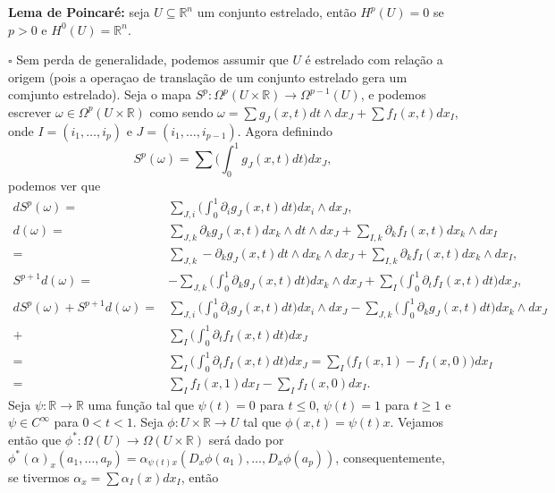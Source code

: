\documentclass{article}
\begin{document}
	\textbf{Lema de Poincaré:} seja $U \subseteq \mathbb{R}^{n}$ um conjunto estrelado, então $H^{p}(U) = 0$ se $p>0$ e $H^{0}(U) = \mathbb{R}^{n}$.
	
	$\square$ Sem perda de generalidade, podemos assumir que $U$ é estrelado com relação a origem (pois a operaçao de translação de um conjunto estrelado gera um comjunto estrelado). Seja o mapa $S^{p}: \Omega^{p}(U \times \mathbb{R}) \to \Omega^{p-1}(U)$, e podemos escrever $\omega \in \Omega^{p}(U \times \mathbb{R}) $ como sendo $\omega = \sum g_{J}(x,t)dt \wedge dx_{J} + \sum f_{I}(x,t)dx_{I}$, onde $I=(i_{1}, \dots ,i_{p})$ e $J=(i_{1}, \dots ,i_{p-1})$. Agora definindo
	$$
	S^{p}(\omega) = \sum \Big( \int_{0}^{1} g_{J}(x,t)dt \Big) dx_{J},
	$$
	podemos ver que
	$$
	\begin{aligned}
	dS^{p}(\omega) =& \sum_{J,i} \Big( \int_{0}^{1} \partial_{i} g_{J}(x,t)dt \Big) dx_{i} \wedge dx_{J},
	\\
	d(\omega) =& \sum_{J,k} \partial_{k} g_{J}(x,t) dx_{k} \wedge dt \wedge dx_{J} + \sum_{I,k} \partial_{k} f_{I}(x,t) dx_{k} \wedge dx_{I}
	\\
	 =& \sum_{J,k} -\partial_{k} g_{J}(x,t) dt \wedge dx_{k} \wedge dx_{J} + \sum_{I,k} \partial_{k} f_{I}(x,t) dx_{k} \wedge dx_{I},
	 \\
	 S^{p+1}d(\omega) =&  -\sum_{J,k} \Big( \int_{0}^{1}  \partial_{k} g_{J}(x,t)dt \Big) dx_{k} \wedge dx_{J} + \sum_{I} \Big( \int_{0}^{1}  \partial_{t} f_{I}(x,t)dt \Big) dx_{J},
	 \\
	  d S^{p}(\omega) + S^{p+1}d(\omega) =& \sum_{J,i} \Big( \int_{0}^{1} \partial_{i} g_{J}(x,t)dt \Big) dx_{i} \wedge dx_{J} -\sum_{J,k} \Big( \int_{0}^{1}  \partial_{k} g_{J}(x,t)dt \Big) dx_{k} \wedge dx_{J} 
	  \\
	  +& \sum_{I} \Big( \int_{0}^{1}  \partial_{t} f_{I}(x,t)dt \Big) dx_{J}
	  \\
	  =& \sum_{I} \Big( \int_{0}^{1}  \partial_{t} f_{I}(x,t)dt \Big) dx_{J} = \sum_{I} \Big( f_{I}(x,1)  - f_{I}(x,0)\Big) dx_{I}
	  \\
	  =& \sum_{I} f_{I}(x,1) dx_{I} - \sum_{I} f_{I}(x,0) dx_{I}.
	\end{aligned}
	$$
	Seja $\psi:\mathbb{R} \to \mathbb{R}$ uma função tal que $\psi(t) = 0$ para $ t \leq 0$, $\psi(t) = 1$ para $ t \geq 1$ e $\psi \in C^{\infty}$ para $0 < t < 1$. Seja $\phi: U \times \mathbb{R} \to U$ tal que $\phi(x,t) = \psi(t)x$. Vejamos então que $\phi^{*} : \Omega(U) \to \Omega(U \times \mathbb{R})$ será dado por $\phi^{*}(\alpha)_{x}(a_{1},\dots,a_{p}) = \alpha_{\psi(t)x}(D_{x}\phi(a_{1}),\dots, D_{x}\phi(a_{p}))$, consequentemente, se tivermos $\alpha_{x} = \sum \alpha_{I}(x)dx_{I}$, então 
\end{document}
